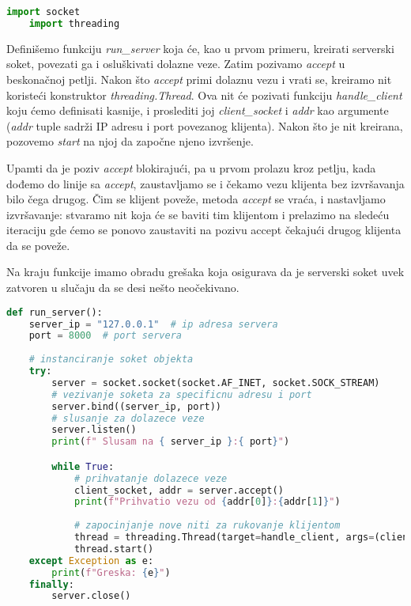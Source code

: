 \begin{lstlisting}[language = Python]
    import socket
    import threading
\end{lstlisting}

Definišemo funkciju \emph{run\_server} koja će, kao u prvom primeru, kreirati serverski soket, povezati ga i osluškivati dolazne veze. Zatim pozivamo \emph{accept} u beskonačnoj petlji. Nakon što \emph{accept} primi dolaznu vezu i vrati se, kreiramo nit koristeći konstruktor \emph{threading.Thread}. Ova nit će pozivati funkciju \emph{handle\_client} koju ćemo definisati kasnije, i proslediti joj \emph{client\_socket} i \emph{addr} kao argumente (\emph{addr} tuple sadrži IP adresu i port povezanog klijenta). Nakon što je nit kreirana, pozovemo \emph{start} na njoj da započne njeno izvršenje.

Upamti da je poziv \emph{accept} blokirajući, pa u prvom prolazu kroz petlju, kada dođemo do linije sa \emph{accept}, zaustavljamo se i čekamo vezu klijenta bez izvršavanja bilo čega drugog. Čim se klijent poveže, metoda \emph{accept} se vraća, i nastavljamo izvršavanje: stvaramo nit koja će se baviti tim klijentom i prelazimo na sledeću iteraciju gde ćemo se ponovo zaustaviti na pozivu accept čekajući drugog klijenta da se poveže.

Na kraju funkcije imamo obradu grešaka koja osigurava da je serverski soket uvek zatvoren u slučaju da se desi nešto neočekivano.

\vspace{0.5cm}

\begin{lstlisting}[language = Python]
    def run_server():
    server_ip = "127.0.0.1"  # ip adresa servera
    port = 8000  # port servera
    
    # instanciranje soket objekta
    try:
        server = socket.socket(socket.AF_INET, socket.SOCK_STREAM)
        # vezivanje soketa za specificnu adresu i port
        server.bind((server_ip, port))
        # slusanje za dolazece veze
        server.listen()
        print(f" Slusam na { server_ip }:{ port}")

        while True:
            # prihvatanje dolazece veze
            client_socket, addr = server.accept()
            print(f"Prihvatio vezu od {addr[0]}:{addr[1]}")
            
            # zapocinjanje nove niti za rukovanje klijentom
            thread = threading.Thread(target=handle_client, args=(client_socket, addr,))
            thread.start()
    except Exception as e:
        print(f"Greska: {e}")
    finally:
        server.close()
\end{lstlisting}

